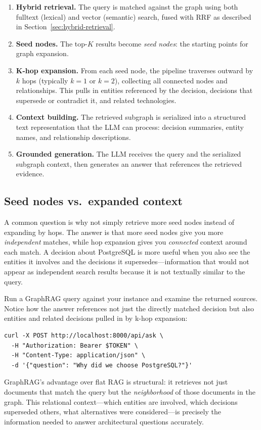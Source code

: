 \begin{enumerate}
    \item \textbf{Hybrid retrieval.} The query is matched against the graph
          using both fulltext (lexical) and vector (semantic) search, fused
          with RRF as described in Section~\ref{sec:hybrid-retrieval}.
    \item \textbf{Seed nodes.} The top-$K$ results become \emph{seed nodes}:
          the starting points for graph expansion.
    \item \textbf{K-hop expansion.} From each seed node, the pipeline
          traverses outward by $k$ hops (typically $k = 1$ or $k = 2$),
          collecting all connected nodes and relationships. This pulls in
          entities referenced by the decision, decisions that supersede or
          contradict it, and related technologies.
    \item \textbf{Context building.} The retrieved subgraph is serialized
          into a structured text representation that the LLM can process:
          decision summaries, entity names, and relationship descriptions.
    \item \textbf{Grounded generation.} The LLM receives the query and the
          serialized subgraph context, then generates an answer that
          references the retrieved evidence.
\end{enumerate}

\subsection{Seed nodes vs.\ expanded context}

A common question is why not simply retrieve more seed nodes instead of
expanding by hops. The answer is that more seed nodes give you more
\emph{independent} matches, while hop expansion gives you \emph{connected}
context around each match. A decision about PostgreSQL is more useful when you
also see the entities it involves and the decisions it supersedes---information
that would not appear as independent search results because it is not
textually similar to the query.

\begin{tryit}
Run a GraphRAG query against your \sysname{} instance and examine the
returned sources. Notice how the answer references not just the directly
matched decision but also entities and related decisions pulled in by k-hop
expansion:
\begin{lstlisting}[style=bash]
curl -X POST http://localhost:8000/api/ask \
  -H "Authorization: Bearer $TOKEN" \
  -H "Content-Type: application/json" \
  -d '{"question": "Why did we choose PostgreSQL?"}'
\end{lstlisting}
\end{tryit}

\begin{keyinsight}
GraphRAG's advantage over flat RAG is structural: it retrieves not just
documents that match the query but the \emph{neighborhood} of those documents
in the graph. This relational context---which entities are involved, which
decisions superseded others, what alternatives were considered---is precisely
the information needed to answer architectural questions accurately.
\end{keyinsight}
